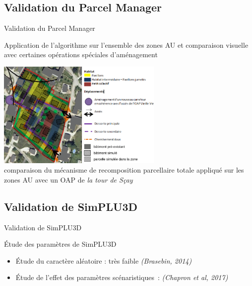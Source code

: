 \documentclass[xcolor=table]{beamer}
\begin{document}
\subsection{Validation du Parcel Manager}
\begin{frame}
\subsectionpage
\end{frame}

\begin{frame}{Validation du Parcel Manager}
	\begin{block}{}	\small 
		Application de l'algorithme sur l'ensemble des zones AU et comparaison visuelle avec certaines opérations spéciales d'aménagement
	\end{block}
\vspace{-0.2cm}
	\begin{block}{}
		\includegraphics[width=8cm]{Images/OAPTour-de-Say2.png}
		\\
		{\footnotesize comparaison du mécanisme de recomposition parcellaire totale appliqué sur les zones AU avec un OAP de \textit{la tour de Sçay}}
	\end{block}
\end{frame}

\begin{frame}
\subsectionpage
\end{frame}

\subsection{Validation de SimPLU3D}

\begin{frame}{Validation de SimPLU3D}
	\begin{block}{Étude des paramètres de SimPLU3D}
		\begin{itemize}
			\item Étude du caractère aléatoire : très faible \textit{(Brasebin, 2014)}
			\item Étude de l'effet des paramètres scénaristiques~: \textit{(Chapron et al, 2017)}
		\end{itemize}
	\end{block}
\end{frame}
\end{document}
